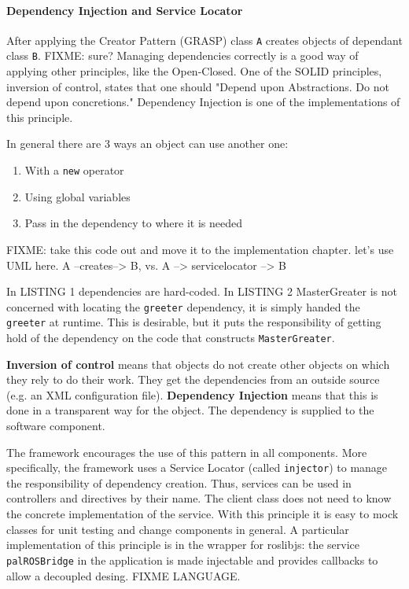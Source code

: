 \paragraph{Dependency Injection and Service Locator} 
After applying the Creator Pattern (\ac{GRASP}) class \texttt{A} creates objects of dependant class \texttt{B}.
FIXME: sure? Managing dependencies correctly is a good way of applying other principles, like the Open-Closed.
One of the \ac{SOLID} principles, inversion of control, states that one should "Depend upon Abstractions. Do not depend upon concretions."
Dependency Injection is one of the implementations of this principle.

\cite{Fowler}

In general there are 3 ways an object can use another one:
\begin{enumerate}
	\item With a \texttt{new} operator
	\item Using global variables
	\item Pass in the dependency to where it is needed
\end{enumerate}

FIXME: take this code out and move it to the implementation chapter. let's use UML here.
A --creates--> B, vs. A --> servicelocator --> B





In LISTING 1 dependencies are hard-coded.
In LISTING 2 MasterGreater is not concerned with locating the \texttt{greeter} dependency, it is simply handed the \texttt{greeter} at runtime.
This is desirable, but it puts the responsibility of getting hold of the dependency on the code that constructs \texttt{MasterGreater}.


\textbf{Inversion of control} means that objects do not create other objects on which they rely to do their work.
They get the dependencies from an outside source (e.g. an \ac{XML} configuration file).
\textbf{Dependency Injection} means that this is done in a transparent way for the object.
The dependency is supplied to the software component.

The framework encourages the use of this pattern in all components. 
More specifically, the framework uses a Service Locator  (called \texttt{injector}) to manage the responsibility of dependency creation.
Thus, services can be used in controllers and directives by their name.
The client class does not need to know the concrete implementation of the service. 
With this principle it is easy to mock classes for unit testing and change components in general.
A particular implementation of this principle is in the wrapper for roslibjs: the service \texttt{palROSBridge} in the application is made injectable and provides callbacks to allow a decoupled desing. FIXME LANGUAGE.


